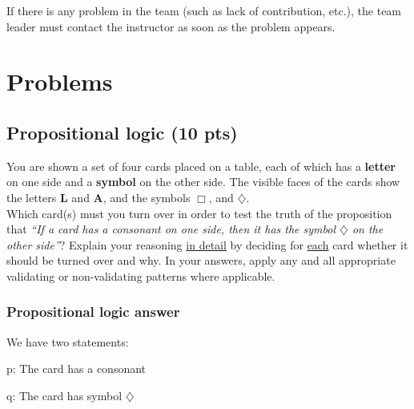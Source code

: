 \documentclass[12pt]{article}
\begin{document}
\noindent If there is any problem in the team (such as lack of contribution, etc.), the team leader must contact the instructor as soon as the problem appears.

\newpage

\section{Problems}

\subsection{Propositional logic (10 pts)}

\noindent You are shown a set of four cards placed on a table, each of which has a \textbf{letter} on one side and a \textbf{symbol} on the other side. The visible faces of the cards show the letters \textbf{L} and \textbf{A}, and the symbols \textbf{$\Box$}, and \textbf{$\diamondsuit$}.\\

\noindent Which card(s) must you turn over in order to test the truth of the proposition that \textit{``If a card has a consonant on one side, then it has the symbol $\diamondsuit$ on the other side''}? Explain your reasoning \underline{in detail} by deciding for \underline{each} card whether it should be turned over and why. In your answers, apply any and all appropriate validating or non-validating patterns where applicable.\\


\subsubsection{Propositional logic answer}

\noindent We have two statements:

\indent p: The card has a consonant

\indent q: The card has symbol \textbf{$\diamondsuit$}
\end{document}
